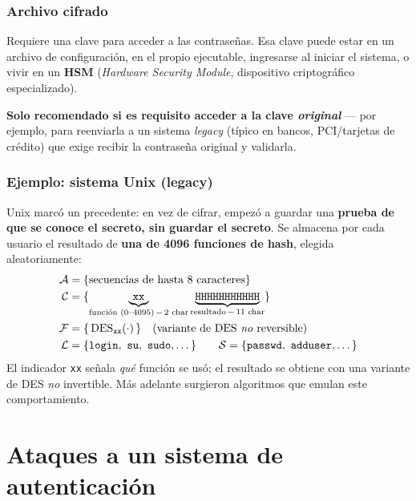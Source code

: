 \documentclass[11pt,a4paper]{article}
\newcommand{\Aset}{\mathcal{A}}
\newcommand{\Cset}{\mathcal{C}}
\newcommand{\Fset}{\mathcal{F}}
\newcommand{\Lset}{\mathcal{L}}
\newcommand{\Sset}{\mathcal{S}}
\begin{document}
\subsubsection{Archivo cifrado}
Requiere una clave para acceder a las contraseñas. Esa clave puede estar en un archivo de
configuración, en el propio ejecutable, ingresarse al iniciar el sistema, o vivir en un
\textbf{HSM} (\emph{Hardware Security Module}, dispositivo criptográfico especializado).
\begin{slidebox}
\textbf{Solo recomendado si es requisito acceder a la clave \emph{original}} — por ejemplo,
para reenviarla a un sistema \emph{legacy} (típico en bancos, PCI/tarjetas de crédito) que
exige recibir la contraseña original y validarla.
\end{slidebox}

\subsubsection{Ejemplo: sistema Unix (legacy)}
Unix marcó un precedente: en vez de cifrar, empezó a guardar una \textbf{prueba de que se
conoce el secreto, sin guardar el secreto}. Se almacena por cada usuario el resultado de
\textbf{una de 4096 funciones de hash}, elegida aleatoriamente:
\[
\begin{aligned}
\Aset &= \{\text{secuencias de hasta 8 caracteres}\}\\
\Cset &= \{\underbrace{\texttt{xx}}_{\text{función }(0\text{--}4095)\,-\,2\text{ char}}
              \underbrace{\texttt{HHHHHHHHHHH}}_{\text{resultado}\,-\,11\text{ char}}\}\\
\Fset &= \{\,\mathrm{DES}_{\texttt{xx}}(\cdot)\,\}\quad(\text{variante de DES \emph{no} reversible})\\
\Lset &= \{\texttt{login},\ \texttt{su},\ \texttt{sudo},\dots\}\qquad
\Sset = \{\texttt{passwd},\ \texttt{adduser},\dots\}
\end{aligned}
\]
El indicador \texttt{xx} señala \emph{qué} función se usó; el resultado se obtiene con una
variante de DES \emph{no} invertible. Más adelante surgieron algoritmos que emulan este
comportamiento.

\section{Ataques a un sistema de autenticación}
\end{document}

